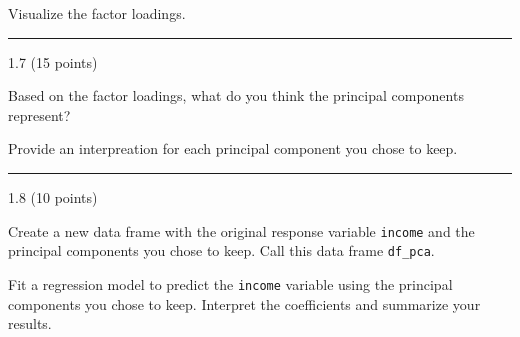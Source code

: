 \documentclass[
  letterpaper,
  DIV=11,
  numbers=noendperiod]{scrartcl}
\newenvironment{Shaded}{\begin{snugshade}}{\end{snugshade}}
\newcommand{\DecValTok}[1]{\textcolor[rgb]{0.68,0.00,0.00}{#1}}
\newcommand{\FunctionTok}[1]{\textcolor[rgb]{0.28,0.35,0.67}{#1}}
\newcommand{\NormalTok}[1]{\textcolor[rgb]{0.00,0.23,0.31}{#1}}
\newcommand{\OtherTok}[1]{\textcolor[rgb]{0.00,0.23,0.31}{#1}}
\newcommand{\SpecialCharTok}[1]{\textcolor[rgb]{0.37,0.37,0.37}{#1}}
\newcommand{\StringTok}[1]{\textcolor[rgb]{0.13,0.47,0.30}{#1}}
\begin{document}
Visualize the factor loadings.

\begin{Shaded}
\end{Shaded}

\begin{center}\rule{0.5\linewidth}{0.5pt}\end{center}

1.7 (15 points)

Based on the factor loadings, what do you think the principal components
represent?

Provide an interpreation for each principal component you chose to keep.

\begin{center}\rule{0.5\linewidth}{0.5pt}\end{center}

1.8 (10 points)

Create a new data frame with the original response variable
\texttt{income} and the principal components you chose to keep. Call
this data frame \texttt{df\_pca}.

\begin{Shaded}
\end{Shaded}

Fit a regression model to predict the \texttt{income} variable using the
principal components you chose to keep. Interpret the coefficients and
summarize your results.
\end{document}
